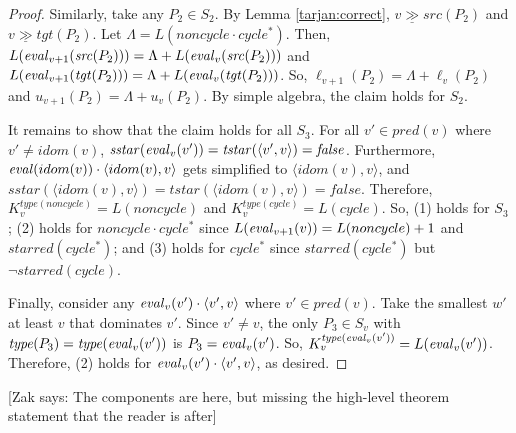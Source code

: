 \documentclass{article}
\newcommand{\tuple}[1]{\langle #1 \rangle}
\newcommand{\strictlydominates}{\mathrel{\gg}}
\newcommand{\dominates}{\mathrel{\underline{\strictlydominates}}}
\newcommand{\false}{\mathit{false}}
\newcommand{\eval}[2][]{
  \ifthenelse{ \equal{#1}{} }
  {\mathit{eval}(#2)}
  {\mathit{eval}_{#1}(#2)}
}
\newcommand{\src}[1]{\mathit{src}(#1)}
\newcommand{\tgt}[1]{\mathit{tgt}(#1)}
\newcommand{\sstar}[1]{\mathit{sstar}(#1)}
\newcommand{\tstar}[1]{\mathit{tstar}(#1)}
\newcommand{\starred}[1]{\mathit{starred}(#1)}
\newcommand{\type}[1]{\mathit{type}(#1)}
\newcommand{\zak}[1]{{\color{blue}[Zak says: #1]}}
\theoremstyle{definition}
\begin{document}
\begin{proof}
  Similarly, take any $P_2 \in S_2$. By Lemma
  \ref{tarjan:correct}, $v \dominates \src{P_2}$ and
  $v \dominates \tgt{P_2}$. Let
  $\Lambda = L(noncycle \cdot cycle^*)$. Then,
  $L(\eval[v+1]{\src{P_2}}) = \Lambda + L(\eval[v]{\src{P_2}})$
  and
  $L(\eval[v+1]{\tgt{P_2}}) = \Lambda +
  L(\eval[v]{\tgt{P_2}})$. So,
  $\ell_{v+1}(P_2) = \Lambda + \ell_v(P_2)$ and
  $u_{v+1}(P_2) = \Lambda + u_v(P_2)$. By simple algebra, the
  claim holds for $S_2$.

  It remains to show that the claim holds for all $S_3$. For all
  $v' \in pred(v)$ where $v'\ne idom(v)$,
  $\sstar{\eval[v]{v'}} = \tstar{\tuple{v',v}} =
  \false$. Furthermore, $\eval{idom(v)}\cdot \tuple{idom(v), v}$
  gets simplified to $\tuple{idom(v), v}$, and
  $\sstar{\tuple{idom(v), v}} = \tstar{\tuple{idom(v), v}} =
  \false$. Therefore, $K_v^{\type{noncycle}} = L(noncycle)$ and
  $K_v^{\type{cycle}} = L(cycle)$. So, (1) holds for $S_3$; (2)
  holds for $noncycle \cdot cycle^*$ since
  $L(\eval[v+1]{v}) = L(noncycle) + 1$ and $\starred{cycle^*}$;
  and (3) holds for $cycle^*$ since $\starred{cycle^*}$ but
  $\neg \starred{cycle}$.

  Finally, consider any $\eval[v]{v'} \cdot \tuple{v', v}$ where
  $v' \in pred(v)$. Take the smallest $w'$ at least $v$ that
  dominates $v'$. Since $v' \ne v$, the only $P_3\in S_v$ with
  $\type{P_3} = \type{\eval[v]{v'}}$ is $P_3 = \eval[v]{v'}$. So,
  $K_v^{\type{\eval[v]{v'}}} = L(\eval[v]{v'})$. Therefore, (2)
  holds for $\eval[v]{v'} \cdot \tuple{v', v}$, as desired.
\end{proof}

\zak{The components are here, but missing the high-level theorem
  statement that the reader is after}
\end{document}
